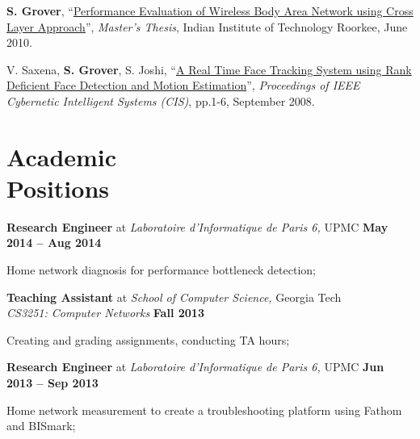 \documentclass[margin,line]{resume}
\begin{document}
\begin{resume}
\vspace{-2.5mm}
    \textbf{S. Grover},
    ``\href{https://docs.google.com/open?id=0BysO4IvPeA4SMjQ5N2MzZWMtNjYxNC00MzA5LWI0ODUtODdlMjFkZWMzNDBm}
    {Performance Evaluation of Wireless Body Area Network using Cross Layer Approach}'',
    \emph{Master's Thesis}, Indian Institute of Technology Roorkee, June 2010.

\vspace{-2.5mm}
    V. Saxena, \textbf{S. Grover}, S. Joshi,
    ``\href{http://dx.doi.org/10.1109/UKRICIS.2008.4798956}
    {A Real Time Face Tracking System using Rank Deficient Face Detection and Motion Estimation}'',
    \emph{Proceedings of IEEE Cybernetic Intelligent Systems (CIS)}, pp.1-6,
    September 2008.

    \section{\mysidestyle \normalsize Academic\\Positions}
    \textbf{Research Engineer} at \emph{Laboratoire d’Informatique de Paris 6,} UPMC 	\hfill \textbf{May 2014 -- Aug 2014} \\\vspace{-4mm}
    \begin{list2}
    \item Home network diagnosis for performance bottleneck detection;
    \end{list2}
\vspace{-1.5mm}

    \textbf{Teaching Assistant}  at \emph{School of Computer Science,} Georgia Tech\\
    \emph{CS3251: Computer Networks}						\hfill \textbf{Fall 2013}\\\vspace{-4mm}
    \begin{list2}
    \item Creating and grading assignments, conducting TA hours;
    \end{list2}
    
    \textbf{Research Engineer} at \emph{Laboratoire d’Informatique de Paris 6,} UPMC 	\hfill \textbf{Jun 2013 -- Sep 2013} \\\vspace{-4mm}
    \begin{list2}
    \item Home network measurement to create a troubleshooting platform using Fathom and BISmark;
    \end{list2}
\vspace{-1.5mm}


\end{resume}
\end{document}
